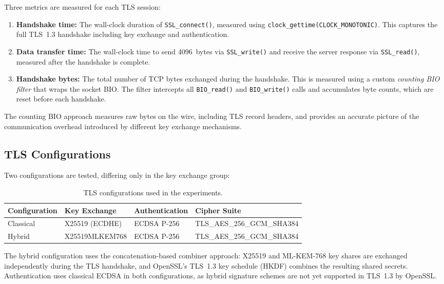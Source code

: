 \documentclass[11pt,a4paper]{article}
\begin{document}
Three metrics are measured for each TLS session:

\begin{enumerate}
    \item \textbf{Handshake time:} The wall-clock duration of \texttt{SSL\_connect()}, measured using \texttt{clock\_gettime(CLOCK\_MONOTONIC)}. This captures the full TLS~1.3 handshake including key exchange and authentication.

    \item \textbf{Data transfer time:} The wall-clock time to send 4096~bytes via \texttt{SSL\_write()} and receive the server response via \texttt{SSL\_read()}, measured after the handshake is complete.

    \item \textbf{Handshake bytes:} The total number of TCP bytes exchanged during the handshake. This is measured using a custom \emph{counting BIO filter} that wraps the socket BIO. The filter intercepts all \texttt{BIO\_read()} and \texttt{BIO\_write()} calls and accumulates byte counts, which are reset before each handshake.
\end{enumerate}

The counting BIO approach measures raw bytes on the wire, including TLS record headers, and provides an accurate picture of the communication overhead introduced by different key exchange mechanisms.

\subsection{TLS Configurations}

Two configurations are tested, differing only in the key exchange group:

\begin{table}[h]
\centering
\begin{tabular}{llll}
\toprule
\textbf{Configuration} & \textbf{Key Exchange} & \textbf{Authentication} & \textbf{Cipher Suite} \\
\midrule
Classical & X25519 (ECDHE) & ECDSA P-256 & TLS\_AES\_256\_GCM\_SHA384 \\
Hybrid    & X25519MLKEM768 & ECDSA P-256 & TLS\_AES\_256\_GCM\_SHA384 \\
\bottomrule
\end{tabular}
\caption{TLS configurations used in the experiments.}
\label{tab:configurations}
\end{table}

The hybrid configuration uses the concatenation-based combiner approach: X25519 and ML-KEM-768 key shares are exchanged independently during the TLS handshake, and OpenSSL's TLS~1.3 key schedule (HKDF) combines the resulting shared secrets. Authentication uses classical ECDSA in both configurations, as hybrid signature schemes are not yet supported in TLS~1.3 by OpenSSL.
\end{document}

